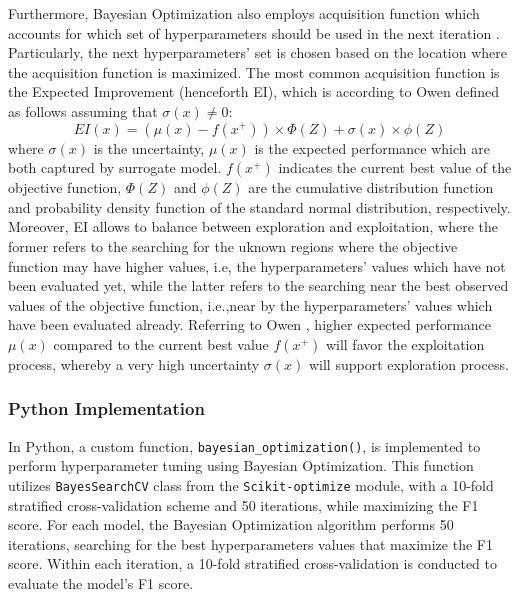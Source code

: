 Furthermore, Bayesian Optimization also employs acquisition function which accounts for which set of hyperparameters should be used in the next iteration \citep{owen2022hyperparameter}. Particularly, the next hyperparameters' set is chosen based on the location where the acquisition function is maximized.
The most common acquisition function is the Expected Improvement (henceforth EI), which is according to Owen \citep{owen2022hyperparameter} defined as follows assuming that $ \sigma\left(x\right) \neq 0$:
\begin{equation}\label{eq}
    EI(x) = \left(\mu\left(x\right) - f\left(x^{+}\right)\right) \times \Phi\left(Z\right) + \sigma\left(x\right) \times \phi\left(Z\right)
\end{equation}
where $\sigma\left(x\right)$ is the uncertainty, $\mu\left(x\right)$ is the expected performance which are both captured by surrogate model. $f\left(x^{+}\right)$ indicates the current best value of the objective function, $\Phi\left(Z\right)$ and $\phi\left(Z\right)$ are the cumulative distribution function and probability density function of the standard normal distribution, respectively.
Moreover, EI allows to balance between exploration and exploitation, where the former refers to the searching for the uknown regions where the objective function may have higher values, i.e, the hyperparameters' values which have not been evaluated yet, while the latter refers to the searching near the best observed values of the objective function, i.e.,near by the hyperparameters' values which have been evaluated already.
Referring to Owen \citep{owen2022hyperparameter}, higher expected performance $\mu\left(x\right)$ compared to the current best value $f\left(x^{+}\right)$ will favor the exploitation process, whereby a very high uncertainty $\sigma\left(x\right)$ will support exploration process.

\subsubsection{Python Implementation}

In Python, a custom function, \lstinline{bayesian_optimization()}, is implemented to perform hyperparameter tuning using Bayesian Optimization.
This function utilizes \lstinline{BayesSearchCV} class from the \lstinline{Scikit-optimize} module, with a 10-fold stratified cross-validation scheme and 50 iterations, while maximizing the F1 score.
For each model, the Bayesian Optimization algorithm performs 50 iterations, searching for the best hyperparameters values that maximize the F1 score. Within each iteration, a 10-fold stratified cross-validation is conducted to evaluate the model's F1 score.

